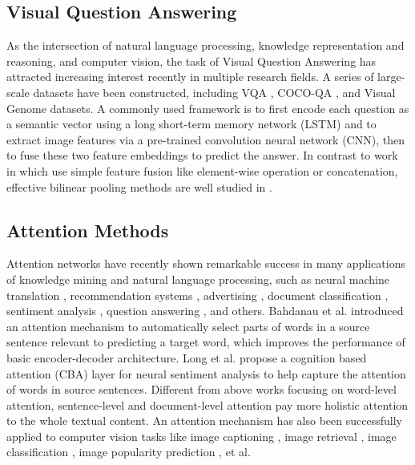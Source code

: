 \documentclass[sigconf]{acmart}
\begin{document}
\subsection{Visual Question Answering}
As the intersection of natural language processing, knowledge representation and reasoning, and computer vision, 
the task of Visual Question Answering has attracted increasing interest recently in multiple research fields. 
A series of large-scale datasets have been constructed, including VQA \cite{antol2015vqa},
COCO-QA \cite{ren2015exploring}, and Visual Genome \cite{krishna2017visual} datasets. 
A commonly used framework is to first encode each question as a semantic vector using a long short-term memory network (LSTM) 
and to extract image features via a pre-trained convolution neural network (CNN),
then to fuse these two feature embeddings to predict the answer.
In contrast to work in  \cite{noh2016image,ilievski2016focused,xiong2016dynamic} which use simple feature fusion like 
element-wise operation or concatenation, effective bilinear pooling methods are well studied in \cite{fukui2016multimodal,kim2016hadamard,benyounescadene2017mutan}.


\subsection{Attention Methods}
Attention networks have recently shown remarkable success in many applications of knowledge mining and natural language processing, such as neural machine translation  \cite{bahdanau2014neural}, recommendation systems \cite{wang2017dynamic}, advertising  \cite{zhai2016deepintent}, document classification \cite{yang2016hierarchical}, sentiment analysis \cite{long2017cognition}, question answering \cite{li2017context}, and others.
Bahdanau et al. \cite{bahdanau2014neural} introduced an attention mechanism to automatically select parts of words in a source sentence
relevant to predicting a target word, which improves the performance of basic encoder-decoder architecture. Long et al. \cite{long2017cognition}
propose a cognition based attention (CBA) layer for neural sentiment analysis to help capture the attention of words in source sentences.
Different from above works focusing on word-level attention, sentence-level \cite{yang2016hierarchical}
and document-level attention \cite{wang2017dynamic} pay more holistic attention to the whole textual content.
An attention mechanism has also been successfully applied to computer vision tasks like image captioning \cite{you2016image}, image retrieval \cite{liu2015content}, image classification \cite{xiao2015application}, 
image popularity prediction \cite{zhang2018user}, et al. 	
\end{document}
